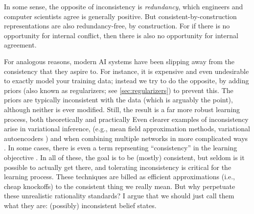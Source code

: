 
In some sense, the opposite of inconsistency is \emph{redundancy}, which engineers and computer scientists agree is generally positive. 
But consistent-by-construction representations are also redundancy-free, by construction. 
For if there is no opportunity for internal conflict, then there is also no opportunity for internal agreement. 

For analogous reasons, modern AI systems have been slipping away from the consistency that they aspire to.
For instance, it is expensive and even undesirable to exactly model your training data; instead we try to do the opposite, by adding priors (also known as regularizers; see \cref{sec:regularizers}) to prevent this.
The priors are typically inconsistent with the data (which is arguably the point), although neither is ever modified. 
Still, the result is a far more robust learning process, both theoretically \cite{ftrl} and practically \cite{regularizers}
%
Even clearer examples of inconsistency arise in variational inference,
    (e.g., mean field approximation methods, variational autoencoders \cite{kingma2013autoencoding})
    and when combining multiple networks 
        in more complicated ways \cite{}.
    In some cases, there is even a term reprsenting ``consistency'' in the learning objecctive \cite{cycle-gan}. 
In all of these, the goal is to be (mostly) consistent, but seldom is it possible to actually get there,
and tolerating inconsistency is critical for the learning process.
%
These techniques are billed
as efficient approximations (i.e., cheap knockoffs) to the consistent thing we really mean.
But why perpetuate these unrealistic rationality standards?
I argue that we should just call them what they are: (possibly) inconsistent belief states.

